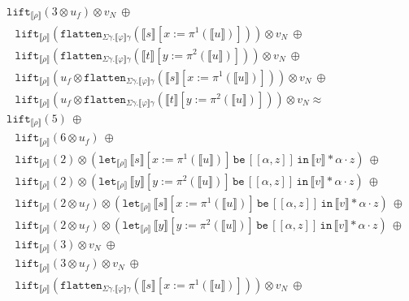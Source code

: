 \documentclass[a4paper,UKenglish,cleveref,autoref,numberwithinsect]{lipics-v2019}
\theoremstyle{definition}
\newcommand{\expair}[2]{[#1,#2]}
\newcommand{\flatten}{\mathtt{flatten}}
\newcommand{\lift}{\mathtt{lift}}
\newcommand{\typeinterpret}[1]{\llbracket #1 \rrbracket}
\newcommand{\interpret}[1]{\llbracket #1 \rrbracket}
\newcommand{\xlet}[4]{\mathtt{let}_{#1}\,#2\,\mathtt{be}\,[#3]\,\mathtt{in}\,#4}
\begin{document}
\begin{itemize}
\[\begin{array}{l}
  \lift_{\typeinterpret{\rho}}(3 \otimes u_f) \otimes v_N\ \oplus \\
  \phantom{A}
  \lift_{\typeinterpret{\rho}}(\flatten_{\Sigma\gamma.\typeinterpret{
    \varphi}\gamma}(\interpret{s}[x:=\pi^1(\interpret{u})]))
    \otimes v_N\ \oplus \\
  \phantom{A}
  \lift_{\typeinterpret{\rho}}(\flatten_{\Sigma\gamma.\typeinterpret{
    \varphi}\gamma}(\interpret{t}[y:=\pi^2(\interpret{u})]))
    \otimes v_N\ \oplus \\
  \phantom{A}
  \lift_{\typeinterpret{\rho}}(u_f \otimes
    \flatten_{\Sigma\gamma.\typeinterpret{\varphi}\gamma}(
    \interpret{s}[x:=\pi^1(\interpret{u})]))
    \otimes v_N\ \oplus \\
  \phantom{A} \lift_{\typeinterpret{\rho}}(u_f \otimes
    \flatten_{\Sigma\gamma.\typeinterpret{
    \varphi}\gamma}(\interpret{t}[y:=\pi^2(\interpret{u})])) \otimes
    v_N \approx \\
  \lift_{\interpret{\rho}}(5)\ \oplus \\
  \phantom{A}
  \lift_{\typeinterpret{\rho}}(6 \otimes u_f)\ \oplus \\
  \phantom{A}
  \lift_{\interpret{\rho}}(2) \otimes
    (\xlet{\typeinterpret{\rho}}{\interpret{s}[x:=\pi^1(
    \interpret{u})]}{\expair{\alpha}{z}}{\interpret{v} * \alpha
    \cdot z})\ \oplus \\
  \phantom{A}
  \lift_{\interpret{\rho}}(2) \otimes
    (\xlet{\typeinterpret{\rho}}{\interpret{y}[y:=\pi^2(
    \interpret{u})]}{\expair{\alpha}{z}}{\interpret{v} * \alpha
    \cdot z})\ \oplus \\
  \phantom{A}
  \lift_{\interpret{\rho}}(2 \otimes u_f) \otimes
    (\xlet{\typeinterpret{\rho}}{\interpret{s}[x:=\pi^1(
    \interpret{u})]}{\expair{\alpha}{z}}{\interpret{v} * \alpha
    \cdot z})\ \oplus \\
  \phantom{A}
  \lift_{\interpret{\rho}}(2 \otimes u_f) \otimes
    (\xlet{\typeinterpret{\rho}}{\interpret{y}[y:=\pi^2(
    \interpret{u})]}{\expair{\alpha}{z}}{\interpret{v} * \alpha
    \cdot z})\ \oplus \\
  \phantom{A}
  \lift_{\typeinterpret{\rho}}(3) \otimes v_N\ \oplus \\
  \phantom{A}
  \lift_{\typeinterpret{\rho}}(3 \otimes u_f) \otimes v_N\ \oplus \\
  \phantom{A}
  \lift_{\typeinterpret{\rho}}(\flatten_{\Sigma\gamma.\typeinterpret{
    \varphi}\gamma}(\interpret{s}[x:=\pi^1(\interpret{u})]))
    \otimes v_N\ \oplus \\

\end{array}\]
\end{itemize}
\end{document}
